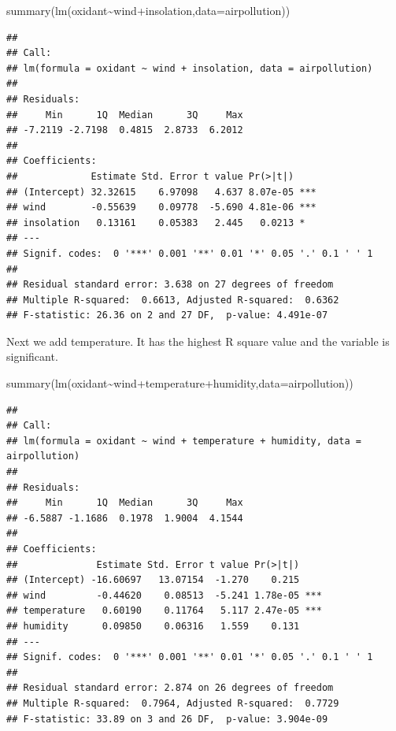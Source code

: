 \documentclass[
]{article}
\newenvironment{Shaded}{\begin{snugshade}}{\end{snugshade}}
\newcommand{\AttributeTok}[1]{\textcolor[rgb]{0.77,0.63,0.00}{#1}}
\newcommand{\FunctionTok}[1]{\textcolor[rgb]{0.00,0.00,0.00}{#1}}
\newcommand{\NormalTok}[1]{#1}
\newcommand{\SpecialCharTok}[1]{\textcolor[rgb]{0.00,0.00,0.00}{#1}}
\begin{document}
\begin{Shaded}
\begin{Highlighting}[]
\FunctionTok{summary}\NormalTok{(}\FunctionTok{lm}\NormalTok{(oxidant}\SpecialCharTok{\textasciitilde{}}\NormalTok{wind}\SpecialCharTok{+}\NormalTok{insolation,}\AttributeTok{data=}\NormalTok{airpollution))}
\end{Highlighting}
\end{Shaded}

\begin{verbatim}
## 
## Call:
## lm(formula = oxidant ~ wind + insolation, data = airpollution)
## 
## Residuals:
##     Min      1Q  Median      3Q     Max 
## -7.2119 -2.7198  0.4815  2.8733  6.2012 
## 
## Coefficients:
##             Estimate Std. Error t value Pr(>|t|)    
## (Intercept) 32.32615    6.97098   4.637 8.07e-05 ***
## wind        -0.55639    0.09778  -5.690 4.81e-06 ***
## insolation   0.13161    0.05383   2.445   0.0213 *  
## ---
## Signif. codes:  0 '***' 0.001 '**' 0.01 '*' 0.05 '.' 0.1 ' ' 1
## 
## Residual standard error: 3.638 on 27 degrees of freedom
## Multiple R-squared:  0.6613, Adjusted R-squared:  0.6362 
## F-statistic: 26.36 on 2 and 27 DF,  p-value: 4.491e-07
\end{verbatim}

Next we add temperature. It has the highest R square value and the
variable is significant.

\begin{Shaded}
\begin{Highlighting}[]
\FunctionTok{summary}\NormalTok{(}\FunctionTok{lm}\NormalTok{(oxidant}\SpecialCharTok{\textasciitilde{}}\NormalTok{wind}\SpecialCharTok{+}\NormalTok{temperature}\SpecialCharTok{+}\NormalTok{humidity,}\AttributeTok{data=}\NormalTok{airpollution))}
\end{Highlighting}
\end{Shaded}

\begin{verbatim}
## 
## Call:
## lm(formula = oxidant ~ wind + temperature + humidity, data = airpollution)
## 
## Residuals:
##     Min      1Q  Median      3Q     Max 
## -6.5887 -1.1686  0.1978  1.9004  4.1544 
## 
## Coefficients:
##              Estimate Std. Error t value Pr(>|t|)    
## (Intercept) -16.60697   13.07154  -1.270    0.215    
## wind         -0.44620    0.08513  -5.241 1.78e-05 ***
## temperature   0.60190    0.11764   5.117 2.47e-05 ***
## humidity      0.09850    0.06316   1.559    0.131    
## ---
## Signif. codes:  0 '***' 0.001 '**' 0.01 '*' 0.05 '.' 0.1 ' ' 1
## 
## Residual standard error: 2.874 on 26 degrees of freedom
## Multiple R-squared:  0.7964, Adjusted R-squared:  0.7729 
## F-statistic: 33.89 on 3 and 26 DF,  p-value: 3.904e-09
\end{verbatim}
\end{document}
